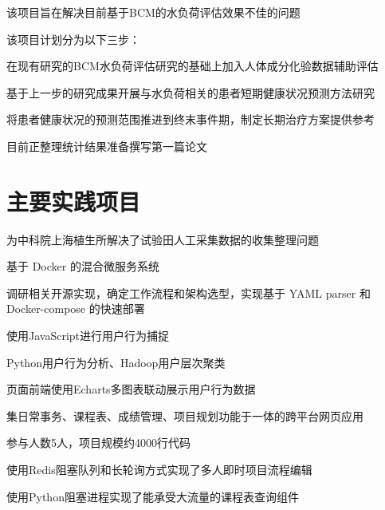 \documentclass[]{deedy-resume-openfont}
\begin{document}
\begin{minipage}[t]{0.73\textwidth}
	\descript{}
    \begin{tightemize}
        \item 该项目旨在解决目前基于BCM的水负荷评估效果不佳的问题
        \item 该项目计划分为以下三步：
        \vspace{\topsep}
        \begin{tightemize}
            \item 在现有研究的BCM水负荷评估研究的基础上加入人体成分化验数据辅助评估
            \item 基于上一步的研究成果开展与水负荷相关的患者短期健康状况预测方法研究
            \item 将患者健康状况的预测范围推进到终末事件期，制定长期治疗方案提供参考
        \end{tightemize}
        \vspace{\topsep}
		\item 目前正整理统计结果准备撰写第一篇论文
	\end{tightemize}
    \sectionsep

    \section{主要实践项目}
	\begin{tightemize}
		\item 为中科院上海植生所解决了试验田人工采集数据的收集整理问题
		\item 基于 Docker 的混合微服务系统
		\item 调研相关开源实现，确定工作流程和架构选型，实现基于 YAML parser 和 Docker-compose 的快速部署
	\end{tightemize}
	\sectionsep

	\begin{tightemize}
		\item 使用JavaScript进行用户行为捕捉
		\item Python用户行为分析、Hadoop用户层次聚类
		\item 页面前端使用Echarts多图表联动展示用户行为数据
	\end{tightemize}
    \sectionsep
    
	\begin{tightemize}
		\item 集日常事务、课程表、成绩管理、项目规划功能于一体的跨平台网页应用
		\item 参与人数5人，项目规模约4000行代码
		\item 使用Redis阻塞队列和长轮询方式实现了多人即时项目流程编辑
		\item 使用Python阻塞进程实现了能承受大流量的课程表查询组件
	\end{tightemize}
	\sectionsep


\end{minipage}
\end{document}
